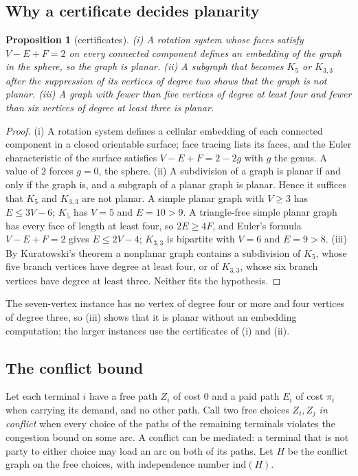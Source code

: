\documentclass[11pt]{article}
\newtheorem{proposition}{Proposition}
\theoremstyle{remark}
\begin{document}
\subsection{Why a certificate decides planarity}
\label{sec:theory-planar}

\begin{proposition}[certificates]
\label{prop:planar}
(i) A rotation system whose faces satisfy $V-E+F=2$ on every connected component defines an embedding of the graph in the sphere, so the graph is planar.
(ii) A subgraph that becomes $K_5$ or $K_{3,3}$ after the suppression of its vertices of degree two shows that the graph is not planar.
(iii) A graph with fewer than five vertices of degree at least four and fewer than six vertices of degree at least three is planar.
\end{proposition}

\begin{proof}
(i) A rotation system defines a cellular embedding of each connected component in a closed orientable surface; face tracing lists its faces, and the Euler characteristic of the surface satisfies $V-E+F=2-2g$ with $g$ the genus.
A value of $2$ forces $g=0$, the sphere. (ii) A subdivision of a graph is planar if and only if the graph is, and a subgraph of a planar graph is planar. Hence it suffices that $K_5$ and $K_{3,3}$ are not planar. A simple planar graph with $V\ge3$ has
$E\le3V-6$; $K_5$ has $V=5$ and $E=10>9$. A triangle-free simple planar graph has every face of length at least four, so $2E\ge4F$, and Euler's formula $V-E+F=2$ gives $E\le2V-4$; $K_{3,3}$ is bipartite with $V=6$ and
$E=9>8$. (iii) By Kuratowski's theorem \cite{Kur30} a nonplanar graph contains a subdivision of $K_5$, whose five branch vertices have degree at least four, or of $K_{3,3}$, whose six branch vertices have degree at least three. Neither
fits the hypothesis.
\end{proof}

The seven-vertex instance has no vertex of degree four or more and four vertices of degree three, so (iii) shows that it is planar without an embedding computation; the larger instances use the certificates of (i) and (ii).

\subsection{The conflict bound}
\label{sec:theory-conflict}

Let each terminal $i$ have a free path $Z_i$ of cost $0$ and a paid path $E_i$ of cost $\pi_i$ when carrying its demand, and no other path. Call two free choices $Z_i,Z_j$ \emph{in conflict} when every choice of the paths of the remaining terminals
violates the congestion bound on some arc. A conflict can be mediated: a terminal that is not party to either choice may load an arc on both of its paths. Let $H$ be the conflict graph on the free choices, with independence number $\mathrm{ind}(H)$.
\end{document}
